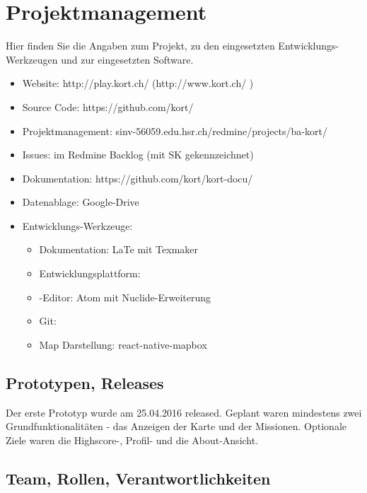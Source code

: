 \chapter{Projektmanagement}
\label{pm-projektmanagement}
Hier finden Sie die Angaben zum Projekt, zu den eingesetzten Entwicklungs-Werkzeugen und zur eingesetzten Software.

\begin{itemize}
    \item Website: http://play.kort.ch/ (http://www.kort.ch/ )
    \item Source Code: https://github.com/kort/
    \item Projektmanagement: sinv-56059.edu.hsr.ch/redmine/projects/ba-kort/
    \item Issues: im Redmine Backlog (mit SK gekennzeichnet)
    \item Dokumentation: https://github.com/kort/kort-docu/
    \item Datenablage: Google-Drive
    \item Entwicklungs-Werkzeuge:
    \begin{itemize}
    	\item Dokumentation: LaTe mit Texmaker
    	\item Entwicklungsplattform: 
    	\item {}-Editor: Atom mit Nuclide-Erweiterung
    	\item Git: 
    	\item Map Darstellung: react-native-mapbox
    \end{itemize}
\end{itemize}


\section{Prototypen, Releases}
Der erste Prototyp wurde am 25.04.2016 released. 
Geplant waren mindestens zwei Grundfunktionalitäten - das Anzeigen der Karte und der Missionen. 
Optionale Ziele waren die Highscore-, Profil- und die About-Ansicht.


\section{Team, Rollen, Verantwortlichkeiten}



